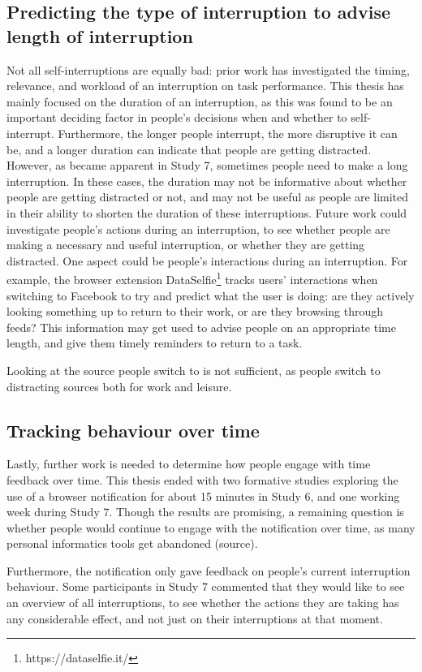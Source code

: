 \subsection{Predicting the type of interruption to advise length of interruption}
Not all self-interruptions are equally bad: prior work has investigated the timing, relevance, and workload of an interruption on task performance. This thesis has mainly focused on the duration of an interruption, as this was found to be an important deciding factor in people's decisions when and whether to self-interrupt. Furthermore, the longer people interrupt, the more disruptive it can be, and a longer duration can indicate that people are getting distracted. However, as became apparent in Study 7, sometimes people need to make a long interruption. In these cases, the duration may not be informative about whether people are getting distracted or not, and may not be useful as people are limited in their ability to shorten the duration of these interruptions. Future work could investigate people's actions during an interruption, to see whether people are making a necessary and useful interruption, or whether they are getting distracted. One aspect could be people's interactions during an interruption. For example, the browser extension DataSelfie\footnote{https://dataselfie.it/} tracks users' interactions when switching to Facebook to try and predict what the user is doing: are they actively looking something up to return to their work, or are they browsing through feeds? This information may get used to advise people on an appropriate time length, and give them timely reminders to return to a task. 

Looking at the source people switch to is not sufficient, as people switch to distracting sources both for work and leisure.

\subsection{Tracking behaviour over time}
Lastly, further work is needed to determine how people engage with time feedback over time. This thesis ended with two formative studies exploring the use of a browser notification for about 15 minutes in Study 6, and one working week during Study 7. Though the results are promising, a remaining question is whether people would continue to engage with the notification over time, as many personal informatics tools get abandoned (source). 

Furthermore, the notification only gave feedback on people’s current interruption behaviour. Some participants in Study 7 commented that they would like to see an overview of all interruptions, to see whether the actions they are taking has any considerable effect, and not just on their interruptions at that moment.

